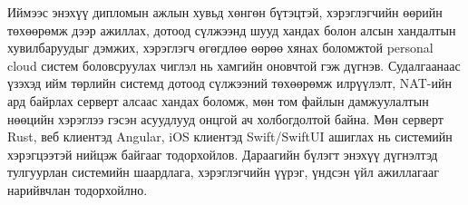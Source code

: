 Иймээс энэхүү дипломын ажлын хувьд хөнгөн бүтэцтэй, хэрэглэгчийн өөрийн төхөөрөмж дээр ажиллах, дотоод сүлжээнд шууд хандах болон алсын хандалтын хувилбаруудыг дэмжих, хэрэглэгч өгөгдлөө өөрөө хянах боломжтой personal cloud систем боловсруулах чиглэл нь хамгийн оновчтой гэж дүгнэв. Судалгаанаас үзэхэд ийм төрлийн системд дотоод сүлжээний төхөөрөмж илрүүлэлт, NAT-ийн ард байрлах серверт алсаас хандах боломж, мөн том файлын дамжуулалтын нөөцийн хэрэглээ гэсэн асуудлууд онцгой ач холбогдолтой байна. Мөн серверт Rust, веб клиентэд Angular, iOS клиентэд Swift/SwiftUI ашиглах нь системийн хэрэгцээтэй нийцэж байгааг тодорхойлов. Дараагийн бүлэгт энэхүү дүгнэлтэд тулгуурлан системийн шаардлага, хэрэглэгчийн үүрэг, үндсэн үйл ажиллагааг нарийвчлан тодорхойлно.

